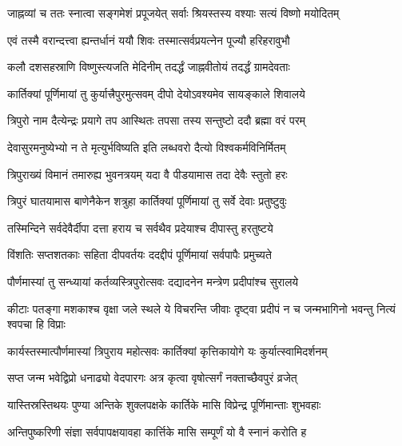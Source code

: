 \twolineshloka
{जाह्नव्यां च ततः स्नात्वा सङ्गमेशं प्रपूजयेत्}
{सर्वाः श्रियस्तस्य वश्याः सत्यं विष्णो मयोदितम्} %

\twolineshloka
{एवं तस्मै वरान्दत्त्वा ह्यन्तर्धानं ययौ शिवः}
{तस्मात्सर्वप्रयत्नेन पूज्यौ हरिहरावुभौ} %

\twolineshloka
{कलौ दशसहस्राणि विष्णुस्त्यजति मेदिनीम्}
{तदर्द्धं जाह्नवीतोयं तदर्द्धं ग्रामदेवताः} %

\twolineshloka
{कार्तिक्यां पूर्णिमायां तु कुर्यात्त्रैपुरमुत्सवम्}
{दीपो देयोऽवश्यमेव सायङ्काले शिवालये} %

\twolineshloka
{त्रिपुरो नाम दैत्येन्द्रः प्रयागे तप आस्थितः}
{तपसा तस्य सन्तुष्टो ददौ ब्रह्मा वरं परम्} %

\twolineshloka
{देवासुरमनुष्येभ्यो न ते मृत्युर्भविष्यति}
{इति लब्धवरो दैत्यो विश्वकर्मविनिर्मितम्} %

\twolineshloka
{त्रिपुराख्यं विमानं तमारुह्य भुवनत्रयम्}
{यदा वै पीडयामास तदा देवैः स्तुतो हरः} %

\twolineshloka
{त्रिपुरं घातयामास बाणेनैकेन शत्रुहा}
{कार्तिक्यां पूर्णिमायां तु सर्वे देवाः प्रतुष्टुवुः} %

\twolineshloka
{तस्मिन्दिने सर्वदेवैर्दीपा दत्ता हराय च}
{सर्वथैव प्रदेयाश्च दीपास्तु हरतुष्टये} %

\twolineshloka
{विंशतिः सप्तशतकाः सहिता दीपवर्तयः}
{ददद्दीपं पूर्णिमायां सर्वपापैः प्रमुच्यते} %

\twolineshloka
{पौर्णमास्यां तु सन्ध्यायां कर्तव्यस्त्रिपुरोत्सवः}
{दद्यादनेन मन्त्रेण प्रदीपांश्च सुरालये} %

\twolineshloka
{कीटाः पतङ्गा मशकाश्च वृक्षा जले स्थले ये विचरन्ति जीवाः}
{दृष्ट्वा प्रदीपं न च जन्मभागिनो भवन्तु नित्यं श्वपचा हि विप्राः} %

\twolineshloka
{कार्यस्तस्मात्पौर्णमास्यां त्रिपुराय महोत्सवः}
{कार्तिक्यां कृत्तिकायोगे यः कुर्यात्स्वामिदर्शनम्} %

\twolineshloka
{सप्त जन्म भवेद्विप्रो धनाढ्यो वेदपारगः}
{अत्र कृत्वा वृषोत्सर्गं नक्ताच्छैवपुरं व्रजेत्} %





\twolineshloka
{यास्तिस्रस्तिथयः पुण्या अन्तिके शुक्लपक्षके}
{कार्तिके मासि विप्रेन्द्र पूर्णिमान्ताः शुभवहाः} %

\twolineshloka
{अन्तिपुष्करिणी संज्ञा सर्वपापक्षयावहा}
{कार्त्तिके मासि सम्पूर्णं यो वै स्नानं करोति ह} %


